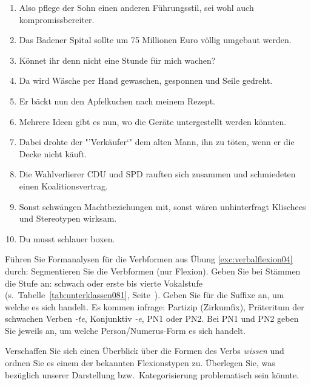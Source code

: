 \begin{sloppypar}
\begin{enumerate}
  \item Also pflege der Sohn einen anderen Führungsstil, sei wohl auch kompromissbereiter.
  \item Das Badener Spital sollte um 75 Millionen Euro völlig umgebaut werden.
  \item Könnet ihr denn nicht eine Stunde für mich wachen?
  \item Da wird Wäsche per Hand gewaschen, gesponnen und Seile gedreht.
  \item Er bäckt nun den Apfelkuchen nach meinem Rezept.
  \item Mehrere Ideen gibt es nun, wo die Geräte untergestellt werden könnten.
  \item Dabei drohte der "'Verkäufer`" dem alten Mann, ihn zu töten, wenn er die Decke nicht käuft.
  \item Die Wahlverlierer CDU und SPD rauften sich zusammen und schmiedeten einen Koalitionsvertrag.
  \item Sonst schwängen Machtbeziehungen mit, sonst wären unhinterfragt Klischees und Stereotypen wirksam.
  \item Du musst schlauer boxen.
\end{enumerate}

 \label{exc:verbalflexion05} Führen Sie Formanalysen für die Verbformen aus Übung \ref{exc:verbalflexion04} durch:
Segmentieren Sie die Verbformen (nur Flexion).
Geben Sie bei Stämmen die Stufe an: schwach oder erste bis vierte Vokalstufe (s.\ Tabelle~\ref{tab:unterklassen081}, Seite~\pageref{tab:unterklassen081}).
Geben Sie für die Suffixe an, um welche es sich handelt.
Es kommen infrage: Partizip (Zirkumfix), Präteritum der schwachen Verben \textit{-te}, Konjunktiv \textit{-e}, PN1 oder PN2.
Bei PN1 und PN2 geben Sie jeweils an, um welche Person/Numerus-Form es sich handelt.

 \label{exc:verbalflexion06} Verschaffen Sie sich einen Überblick über die Formen des Verbs \textit{wissen} und ordnen Sie es einem der bekannten Flexionstypen zu.
Überlegen Sie, was bezüglich unserer Darstellung bzw.\ Kategorisierung problematisch sein könnte.

\end{sloppypar}

